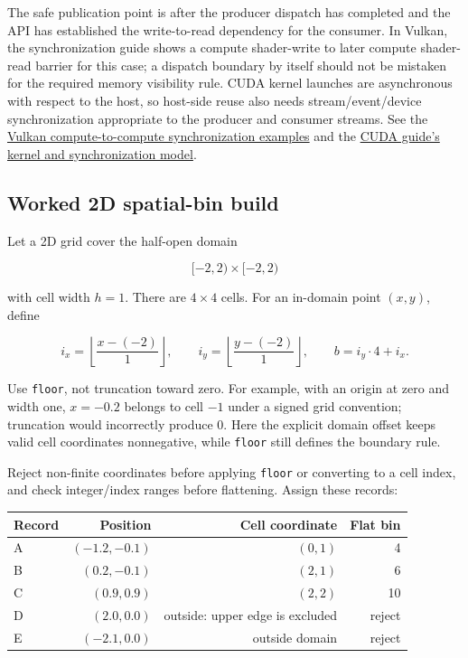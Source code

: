 The safe publication point is after the producer dispatch has completed and the API has established the write-to-read dependency for the consumer. In Vulkan, the synchronization guide shows a compute shader-write to later compute shader-read barrier for this case; a dispatch boundary by itself should not be mistaken for the required memory visibility rule. CUDA kernel launches are asynchronous with respect to the host, so host-side reuse also needs stream/event/device synchronization appropriate to the producer and consumer streams. See the \href{https://docs.vulkan.org/guide/latest/synchronization_examples.html}{Vulkan compute-to-compute synchronization examples} and the \href{https://docs.nvidia.com/cuda/cuda-programming-guide/02-basics/intro-to-cuda-cpp.html}{CUDA guide's kernel and synchronization model}.

\subsection{Worked 2D spatial-bin build}\label{03-visual-computing-i-ch016-worked-2d-spatial-bin-build}

Let a 2D grid cover the half-open domain

\[
[-2,2)\times[-2,2)
\]

with cell width \(h=1\). There are \(4\times4\) cells. For an in-domain point \((x,y)\), define

\[
i_x=\left\lfloor\frac{x-(-2)}{1}\right\rfloor,
\qquad
i_y=\left\lfloor\frac{y-(-2)}{1}\right\rfloor,
\qquad
b=i_y\cdot4+i_x.
\]

Use \texttt{floor}, not truncation toward zero. For example, with an origin at zero and width one, \(x=-0.2\) belongs to cell \(-1\) under a signed grid convention; truncation would incorrectly produce \(0\). Here the explicit domain offset keeps valid cell coordinates nonnegative, while \texttt{floor} still defines the boundary rule.

Reject non-finite coordinates before applying \texttt{floor} or converting to a cell index, and check integer/index ranges before flattening. Assign these records:

{\def\LTcaptype{none} %
\begin{longtable}[]{@{}lrrr@{}}
\toprule\noalign{}
Record & Position & Cell coordinate & Flat bin \\
\midrule\noalign{}
\endhead
\bottomrule\noalign{}
\endlastfoot
A & \((-1.2,-0.1)\) & \((0,1)\) & 4 \\
B & \((0.2,-0.1)\) & \((2,1)\) & 6 \\
C & \((0.9,0.9)\) & \((2,2)\) & 10 \\
D & \((2.0,0.0)\) & outside: upper edge is excluded & reject \\
E & \((-2.1,0.0)\) & outside domain & reject \\
\end{longtable}
}

